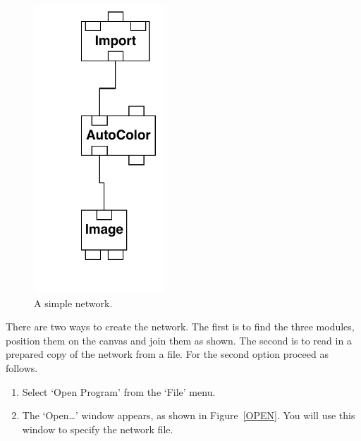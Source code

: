 \documentclass[twoside,11pt]{article}
\begin{document}
\begin{enumerate}
\begin{figure}[htbp]
  \begin{center}
  \leavevmode
  \includegraphics[width=139pt]{sc2_simple}
  \end{center}

  \caption[A simple network.]{A simple network. \label{SIMPLE} }

  \end{figure}

   There are two ways to create the network. The first is to find the
   three modules, position them on the canvas and join them as shown.
   The second is to read in a prepared copy of the network from a file.
   For the second option proceed as follows.

  \begin{enumerate}

    \item Select `Open Program' from the `File' menu.

    \item The `Open\ldots' window appears, as shown in
     Figure~\ref{OPEN}. You will use this window to specify the network
     file.

    \newpage
    \begin{figure}[htbp]


\end{figure}
\end{enumerate}
\end{enumerate}
\end{document}
